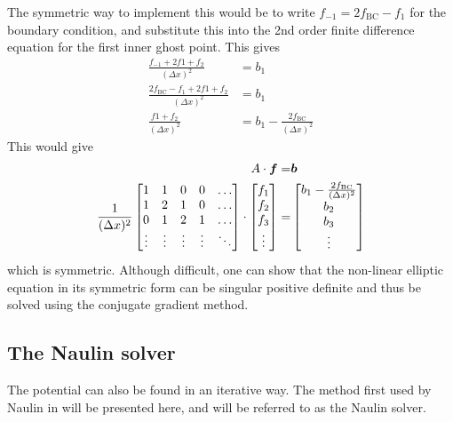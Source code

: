 The symmetric way to implement this would be to write $f_{-1}=2f_{\text{BC}}-f_{1}$ for the boundary condition, and substitute this into the 2nd order finite difference equation for the first inner ghost point.
This gives
%
\begin{align*}
    \frac{f_{-1}+2f{1}+f_{2}}{(\Delta x)^2}&=b_1\\
    \frac{2f_{\text{BC}}-f_{1}+2f{1}+f_{2}}{(\Delta x)^2}&=b_1\\
    \frac{f{1}+f_{2}}{(\Delta x)^2}&=b_1 - \frac{2f_{\text{BC}}}{(\Delta x)^2}
\end{align*}
%
This would give
%
\begin{align*}
    A\cdot\boldsymbol{f}=&\boldsymbol{b}\\
    \frac{1}{(\Delta x)^2}
    \begin{bmatrix}
        1                       & 1                       & 0 & 0 & \ldots\\
        1                       & 2                       & 1 & 0 & \ldots\\
        0                       & 1                       & 2 & 1 & \ldots\\
        \vdots                  & \vdots              &\vdots&\vdots&\ddots\\
    \end{bmatrix}
    \cdot
    \begin{bmatrix}
        f_{1}\\
        f_{2}\\
        f_{3}\\
        \vdots
    \end{bmatrix}
    =&
    \begin{bmatrix}
        b_{1} - \frac{2f_{\text{BC}}}{(\Delta x)^2}\\
        b_{2}\\
        b_{3}\\
        \vdots
    \end{bmatrix}
\end{align*}
%
which is symmetric.
Although difficult, one can show that the non-linear elliptic equation in its symmetric form can be singular positive definite and thus be solved using the conjugate gradient method.

\subsection{The Naulin solver}
%
The potential can also be found in an iterative way.
The method first used by Naulin in \cite{Naulin2008} will be presented here, and will be referred to as the Naulin solver.

